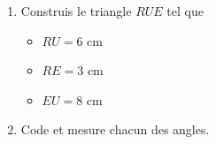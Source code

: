 \begin{pageParcoursd}
\vspace{4cm}
 
 

\begin{minipage}{0.5\linewidth}

\begin{enumerate}
\item Construis le triangle $RUE$ tel que
\begin{itemize}
\item $RU=6$ cm 
\item $RE=3$ cm
\item $EU=8$ cm
\end{itemize}
\item Code et mesure chacun des angles.
\end{enumerate}
\end{minipage}
\begin{minipage}{0.5\linewidth}
\vspace{3cm}
\end{minipage}


\vspace{5cm} 
 
 
 
 
\end{pageParcoursd}

